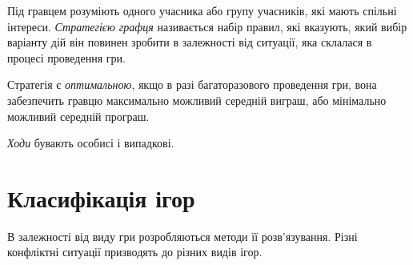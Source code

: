 \documentclass[12pt,a4paper]{book}
\begin{document}
Під гравцем розуміють одного учасника або групу учасників, які мають спільні інтереси. \emph{Стратегією графця} називається набір правил, які вказують, який вибір варіанту дій він повинен зробити в залежності від ситуації, яка склалася в процесі проведення гри.

Стратегія є \emph{оптимальною}, якщо в разі багаторазового проведення гри, вона забезпечить гравцю максимально можливий середній виграш, або мінімально можливий середній програш.

\emph{Ходи} бувають особисі і випадкові.

\section{Класифікація ігор}

В залежності від виду гри розробляються методи її розв'язування. Різні конфліктні ситуації призводять до різних видів ігор.
\end{document}
